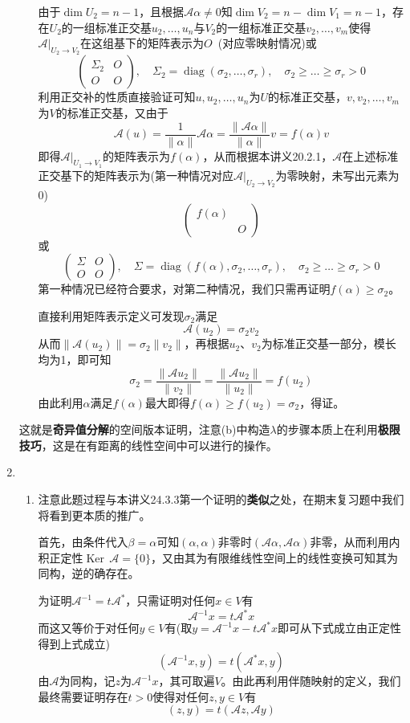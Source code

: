 \documentclass[a4paper,UTF8,fontset=windows,AutoFakeBold]{ctexart}
\DeclareMathOperator{\diag}{diag}
\DeclareMathOperator{\Ker}{Ker\,}
\newcommand*{\ma}{\mathcal{A}}
\newcommand*{\note}{\noindent *}
\begin{document}
\begin{enumerate}
\begin{enumerate}
        由于$\dim U_2=n-1$，且根据$\ma\alpha\ne0$知$\dim V_2=n-\dim V_1=n-1$，存在$U_2$的一组标准正交基$u_2,\dots,u_n$与$V_2$的一组标准正交基$v_2,\dots,v_m$使得$\ma|_{U_2\to V_2}$在这组基下的矩阵表示为$O$\ (对应零映射情况)或
        $$\begin{pmatrix}\Sigma_2&O\\O&O\end{pmatrix},\quad\Sigma_2=\diag(\sigma_2,\dots,\sigma_r),\quad\sigma_2\ge\dots\ge\sigma_r>0$$
        利用正交补的性质直接验证可知$u,u_2,\dots,u_n$为$U$的标准正交基，$v,v_2,\dots,v_m$为$V$的标准正交基，又由于
        $$\ma(u)=\frac{1}{\|\alpha\|}\ma\alpha=\frac{\|\ma\alpha\|}{\|\alpha\|}v=f(\alpha)v$$
        即得$\ma|_{U_1\to V_1}$的矩阵表示为$f(\alpha)$，从而根据本讲义20.2.1，$\ma$在上述标准正交基下的矩阵表示为(第一种情况对应$\ma|_{U_2\to V_2}$为零映射，未写出元素为0)
        $$\begin{pmatrix}f(\alpha)&\\ &O\end{pmatrix}$$
        或
        $$\begin{pmatrix}\Sigma&O\\O&O\end{pmatrix},\quad\Sigma=\diag(f(\alpha),\sigma_2,\dots,\sigma_r),\quad\sigma_2\ge\dots\ge\sigma_r>0$$
        第一种情况已经符合要求，对第二种情况，我们只需再证明$f(\alpha)\ge\sigma_2$。

        直接利用矩阵表示定义可发现$\sigma_2$满足
        $$\ma(u_2)=\sigma_2v_2$$
        从而$\|\ma(u_2)\|=\sigma_2\|v_2\|$，再根据$u_2$、$v_2$为标准正交基一部分，模长均为1，即可知
        $$\sigma_2=\frac{\|\ma u_2\|}{\|v_2\|}=\frac{\|\ma u_2\|}{\|u_2\|}=f(u_2)$$
        由此利用$\alpha$满足$f(\alpha)$最大即得$f(\alpha)\ge f(u_2)=\sigma_2$，得证。
    \end{enumerate}
    \note 这就是\textbf{奇异值分解}的空间版本证明，注意(b)中构造$\lambda$的步骤本质上在利用\textbf{极限技巧}，这是在有距离的线性空间中可以进行的操作。

    \item
    \begin{enumerate}
        \item \note 注意此题过程与本讲义24.3.3第一个证明的\textbf{类似}之处，在期末复习题中我们将看到更本质的推广。
        
        首先，由条件代入$\beta=\alpha$可知$(\alpha,\alpha)$非零时$(\ma\alpha,\ma\alpha)$非零，从而利用内积正定性$\Ker\ma=\{0\}$，又由其为有限维线性空间上的线性变换可知其为同构，逆的确存在。

        为证明$\ma^{-1}=t\ma^*$，只需证明对任何$x\in V$有
        $$\ma^{-1}x=t\ma^*x$$
        而这又等价于对任何$y\in V$有(取$y=\ma^{-1}x-t\ma^*x$即可从下式成立由正定性得到上式成立)
        $$(\ma^{-1}x,y)=t(\ma^*x,y)$$
        由$\ma$为同构，记$z$为$\ma^{-1}x$，其可取遍$V$。由此再利用伴随映射的定义，我们最终需要证明存在$t>0$使得对任何$z,y\in V$有
        $$(z,y)=t(\ma z,\ma y)$$


\end{enumerate}
\end{enumerate}
\end{document}
